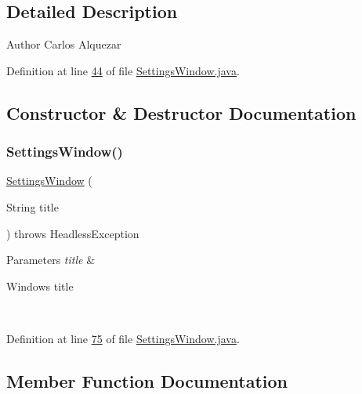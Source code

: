 \subsection{Detailed Description}
\begin{DoxyAuthor}{Author}
Carlos Alquezar 
\end{DoxyAuthor}


Definition at line \hyperlink{_settings_window_8java_source_l00044}{44} of file \hyperlink{_settings_window_8java_source}{Settings\+Window.\+java}.



\subsection{Constructor \& Destructor Documentation}
\hypertarget{classgui_1_1_settings_window_a683036e760caa7899d0d992b16a0ce26}{}\label{classgui_1_1_settings_window_a683036e760caa7899d0d992b16a0ce26} 
\subsubsection{\texorpdfstring{Settings\+Window()}{SettingsWindow()}}
{\footnotesize\ttfamily \hyperlink{classgui_1_1_settings_window}{Settings\+Window} (\begin{DoxyParamCaption}\item[{String}]{title }\end{DoxyParamCaption}) throws Headless\+Exception}


\begin{DoxyParams}{Parameters}
{\em title} & 
\begin{DoxyItemize}
\item Window\textquotesingle{}s title 
\end{DoxyItemize}\\
\hline
\end{DoxyParams}


Definition at line \hyperlink{_settings_window_8java_source_l00075}{75} of file \hyperlink{_settings_window_8java_source}{Settings\+Window.\+java}.



\subsection{Member Function Documentation}
\hypertarget{classgui_1_1_settings_window_a36518806dd93bf1bcbbd809663c30594}{}\label{classgui_1_1_settings_window_a36518806dd93bf1bcbbd809663c30594} 
